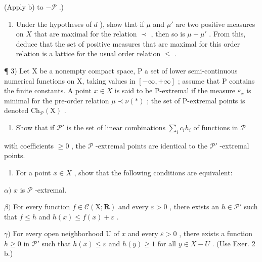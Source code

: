 (Apply b) to \(-\mathcal{P}\) .)

\begin{enumerate}
\def\labelenumi{\alph{enumi})}
\setcounter{enumi}{4}
\tightlist
\item
  Under the hypotheses of \(d\) ), show that if \(\mu\) and \(\mu'\) are two positive measures on \(X\) that are maximal for the relation \(\prec\) , then so is \(\mu + \mu'\) . From this, deduce that the set of positive measures that are maximal for this order relation is a lattice for the usual order relation \(\leqslant\) .
\end{enumerate}

¶ 3) Let X be a nonempty compact space, P a set of lower semi-continuous numerical functions on X, taking values in \([-\infty, +\infty]\) ; assume that P contains the finite constants. A point \(x \in X\) is said to be P-extremal if the measure \(\varepsilon_{x}\) is minimal for the pre-order relation \(\mu \prec \nu (*)\) ; the set of P-extremal points is denoted \(\mathrm{Ch}_{\mathcal{P}}(\mathrm{X})\) .

\begin{enumerate}
\def\labelenumi{\alph{enumi})}
\tightlist
\item
  Show that if \(\mathcal{P}'\) is the set of linear combinations \(\sum_{i} c_i h_i\) of functions in \(\mathcal{P}\)
\end{enumerate}

with coefficients \(\geqslant 0\) , the \(\mathcal{P}\) -extremal points are identical to the \(\mathcal{P}'\) -extremal points.

\begin{enumerate}
\def\labelenumi{\alph{enumi})}
\setcounter{enumi}{1}
\tightlist
\item
  For a point \(x \in X\) , show that the following conditions are equivalent:
\end{enumerate}

\(\alpha)\) \(x\) is \(\mathcal{P}\) -extremal.

\(\beta)\) For every function \(f \in \mathcal{C}(\mathrm{X}; \mathbf{R})\) and every \(\varepsilon > 0\) , there exists an \(h \in \mathcal{P}'\) such that \(f \leqslant h\) and \(h(x) \leqslant f(x) + \varepsilon\) .

\(\gamma)\) For every open neighborhood U of \(x\) and every \(\varepsilon > 0\) , there exists a function \(h \geqslant 0\) in \(\mathcal{P}'\) such that \(h(x) \leqslant \varepsilon\) and \(h(y) \geqslant 1\) for all \(y \in X - U\) . (Use Exer. 2 b.)

